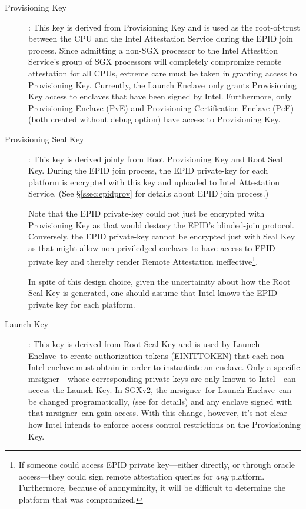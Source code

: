 \documentclass[10pt]{article}
\newcommand{\secref}[1]{\S\ref{#1}}
\newcommand{\mrsigner}{\textsf{mrsigner}}
\newcommand{\pve}{\textsf{PvE}}
\newcommand{\pce}{\textsf{PcE}}
\newcommand{\launchenclave}{\textsf{Launch Enclave}}
\begin{document}
  \begin{description}
  \item[Provisioning Key]: This key is derived from Provisioning Key
    and is used as the root-of-trust between the CPU and the Intel
    Attestation Service during the EPID join process. Since admitting
    a non-SGX processor to the Intel Attesttion Service's group of SGX
    processors will completely compromize remote attestation for all
    CPUs, extreme care must be taken in granting access to
    Provisioning Key. Currently, the \launchenclave\ only grants
    Provisioning Key access to enclaves that have been signed by
    Intel. Furthermore, only Provisioning Enclave (\pve) and
    Provisioning Certification Enclave (\pce) (both created without
    debug option) have access to Provisioning Key.

  \item[Provisioning Seal Key]: This key is derived joinly from Root
    Provisioning Key and Root Seal Key. During the EPID join process,
    the EPID private-key for each platform is encrypted with this key
    and uploaded to Intel Attestation Service. (See
    \secref{ssec:epidprov} for details about EPID join process.)

    Note that the EPID private-key could not just be encrypted with
    Provisioning Key as that would destory the EPID's blinded-join
    protocol. Conversely, the EPID private-key cannot be encrypted
    just with Seal Key as that might allow non-priviledged enclaves to
    have access to EPID private key and thereby render Remote
    Attestation ineffective\footnote{If someone could access EPID
      private key---either directly, or through oracle access---they
      could sign remote attestation queries for \textit{any}
      platform. Furthermore, because of anonymimity, it will be
      difficult to determine the platform that was compromized.}.

    In spite of this design choice, given the uncertainity about how
    the Root Seal Key is generated, one should assume that Intel knows
    the EPID private key for each platform.

  \item[Launch Key]: This key is derived from Root Seal Key and is
    used by \launchenclave\ to create authorization tokens
    (\textsf{EINITTOKEN}) that each non-Intel enclave must obtain in
    order to instantiate an enclave. Only a specific \mrsigner---whose
    corresponding private-keys are only known to Intel---can access
    the Launch Key. In SGXv2, the \mrsigner\ for \launchenclave\ can
    be changed programatically, (see \cite[\S39.1.4]{intelsdm} for
    details) and any enclave signed with that \mrsigner\ can gain
    access. With this change, however, it's not clear how Intel
    intends to enforce access control restrictions on the
    Proviosioning Key.


\end{description}
\end{document}
